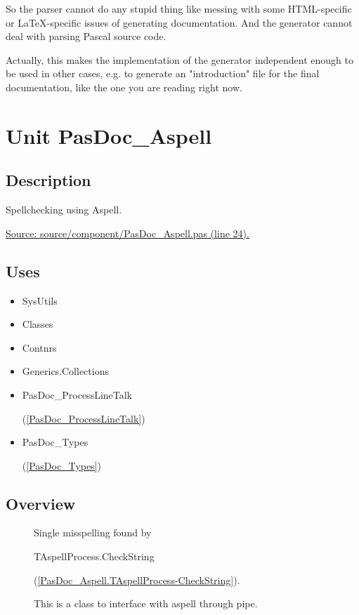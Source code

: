 \documentclass{report}
\begin{document}
So the parser cannot do any stupid thing like messing with some HTML{-}specific or LaTeX{-}specific issues of generating documentation. And the generator cannot deal with parsing Pascal source code.

Actually, this makes the implementation of the generator independent enough to be used in other cases, e.g. to generate an "introduction" file for the final documentation, like the one you are reading right now.\chapter{Unit PasDoc{\_}Aspell}
\label{PasDoc_Aspell}
\section{Description}
Spellchecking using Aspell.\par
\href{https://github.com/pasdoc/pasdoc/blob/master/source/component/PasDoc_Aspell.pas#L24}{Source: source/component/PasDoc{\_}Aspell.pas (line 24).}
\section{Uses}
\begin{itemize}
\item \begin{ttfamily}SysUtils\end{ttfamily}\item \begin{ttfamily}Classes\end{ttfamily}\item \begin{ttfamily}Contnrs\end{ttfamily}\item \begin{ttfamily}Generics.Collections\end{ttfamily}\item \begin{ttfamily}PasDoc{\_}ProcessLineTalk\end{ttfamily}(\ref{PasDoc_ProcessLineTalk})\item \begin{ttfamily}PasDoc{\_}Types\end{ttfamily}(\ref{PasDoc_Types})\end{itemize}
\section{Overview}
\begin{description}
\item[\texttt{\begin{ttfamily}TSpellingError\end{ttfamily} Class}]Single misspelling found by \begin{ttfamily}TAspellProcess.CheckString\end{ttfamily}(\ref{PasDoc_Aspell.TAspellProcess-CheckString}).
\item[\texttt{\begin{ttfamily}TAspellProcess\end{ttfamily} Class}]This is a class to interface with aspell through pipe.
\end{description}
\end{document}
